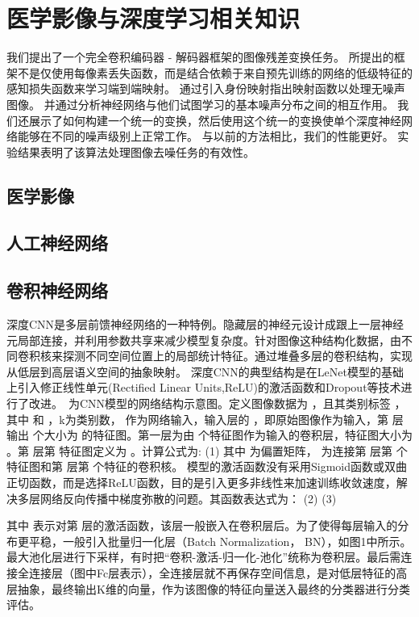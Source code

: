 
\chapter{医学影像与深度学习相关知识}
\label{chap:denoising}

我们提出了一个完全卷积编码器 - 解码器框架的图像残差变换任务。 所提出的框架不是仅使用每像素丢失函数，而是结合依赖于来自预先训练的网络的低级特征的感知损失函数来学习端到端映射。 通过引入身份映射指出映射函数以处理无噪声图像。 并通过分析神经网络与他们试图学习的基本噪声分布之间的相互作用。 我们还展示了如何构建一个统一的变换，然后使用这个统一的变换使单个深度神经网络能够在不同的噪声级别上正常工作。 与以前的方法相比，我们的性能更好。 实验结果表明了该算法处理图像去噪任务的有效性。

\section{医学影像}

 
\section{人工神经网络}

 
\section{卷积神经网络}

深度CNN是多层前馈神经网络的一种特例。隐藏层的神经元设计成跟上一层神经元局部连接，并利用参数共享来减少模型复杂度。针对图像这种结构化数据，由不同卷积核来探测不同空间位置上的局部统计特征。通过堆叠多层的卷积结构，实现从低层到高层语义空间的抽象映射。
深度CNN的典型结构是在LeNet模型\citep{Jarrett2009}的基础上引入修正线性单元(Rectified Linear Units,ReLU)的激活函数和Dropout等技术\citep{Krizhevsky2012}进行了改进。\ 为CNN模型的网络结构示意图。定义图像数据为 ，且其类别标签 ，其中 和 ，k为类别数， 作为网络输入，输入层的 ，即原始图像作为输入，第 层输出 个大小为 的特征图。第一层为由  个特征图作为输入的卷积层，特征图大小为  。第 层第 特征图定义为  。计算公式为:
      (1)
其中 为偏置矩阵， 为连接第 层第 个特征图和第 层第 个特征的卷积核。
模型的激活函数没有采用Sigmoid函数或双曲正切函数，而是选择ReLU函数，目的是引入更多非线性来加速训练收敛速度，解决多层网络反向传播中梯度弥散的问题。其函数表达式为： 
              (2)
          (3)

 其中 表示对第 层的激活函数，该层一般嵌入在卷积层后。为了使得每层输入的分布更平稳，一般引入批量归一化层（Batch Normalization， BN），如图1中所示。最大池化层进行下采样，有时把“卷积-激活-归一化-池化”统称为卷积层。最后需连接全连接层（图中Fc层表示），全连接层就不再保存空间信息，是对低层特征的高层抽象，最终输出K维的向量，作为该图像的特征向量送入最终的分类器进行分类评估。

